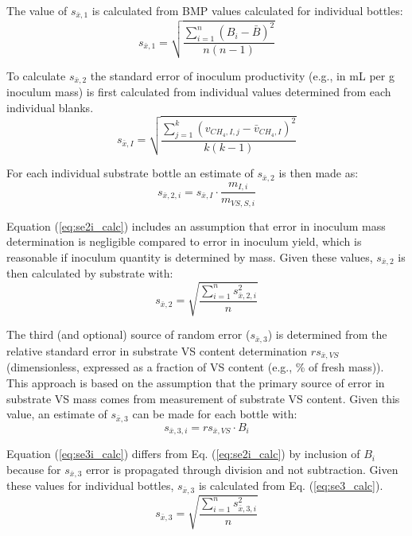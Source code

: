 \documentclass[]{article}
\begin{document}
The value of $s_{\bar{x},1}$ is calculated from BMP values calculated for individual bottles: 
\begin{equation}
  \label{eq:se1_calc}
  s_{\bar{x},1} = \sqrt{ \frac{\sum_{i=1} ^n(B_i - \bar{B})^2} {n(n - 1)} }
\end{equation}

To calculate $s_{\bar{x},2}$ the standard error of inoculum  productivity (e.g., in mL per g inoculum mass) is first calculated from individual values determined from each individual blanks. 
\begin{equation}
  \label{eq:seI_calc}
  s_{\bar{x},I} = \sqrt{\frac{\sum_{j=1} ^k (v_{CH_4, I, j} - \bar{v}_{CH_4, I})^2} {k(k -1)} }
\end{equation}

For each individual substrate bottle an estimate of $s_{\bar{x},2}$ is then made as:
\begin{equation}
  \label{eq:se2i_calc}
  s_{\bar{x},2,i} = s_{\bar{x},I} \cdot \frac{m_{I, i}} {m_{VS, S, i}}
\end{equation}

Equation (\ref{eq:se2i_calc}) includes an assumption that error in inoculum mass determination is negligible compared to error in inoculum  yield, which is reasonable if inoculum quantity is determined by mass. 
Given these values, $s_{\bar{x},2}$ is then calculated by substrate with:
\begin{equation}
  \label{eq:se2_calc}
  s_{\bar{x},2} = \sqrt{\frac{\sum_{i=1} ^n s_{\bar{x},2,i}^2} {n}}
\end{equation}

The third (and optional) source of random error ($s_{\bar{x},3}$) is determined from the relative standard error in substrate VS content determination $rs_{\bar{x},VS}$ (dimensionless, expressed as a fraction of VS content (e.g., \% of fresh mass)).
This approach is based on the assumption that the primary source of error in substrate VS mass comes from measurement of substrate VS content. 
Given this value, an estimate of $s_{\bar{x},3}$ can be made for each bottle with:
\begin{equation}
  \label{eq:se3i_calc}
  s_{\bar{x},3,i} = rs_{\bar{x},VS} \cdot B_{i}
\end{equation}

Equation (\ref{eq:se3i_calc}) differs from Eq. (\ref{eq:se2i_calc}) by inclusion of $B_{i}$ because for $s_{\bar{x},3}$ error is propagated through division and not subtraction. 
Given these values for individual bottles, $s_{\bar{x},3}$ is calculated from Eq. (\ref{eq:se3_calc}).
\begin{equation}
  \label{eq:se3_calc}
  s_{\bar{x},3} = \sqrt{\frac{\sum_{i=1} ^n s_{\bar{x},3,i}^2} {n}}
\end{equation}
\end{document}
